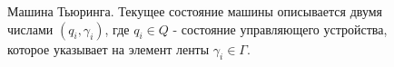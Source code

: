 \begin{figure}
\centering



\caption{Машина Тьюринга. Текущее состояние машины описывается двумя
  числами $(q_i, \gamma_i)$, где $q_i \in Q$ - состояние управляющего
  устройства, которое указывает на элемент ленты $\gamma_i \in \Gamma$.} 
\label{figAddAlgoTuring}
\end{figure}
